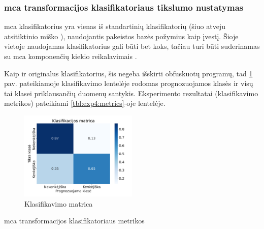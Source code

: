 \subsubsection{\gls{mca} transformacijos klasifikatoriaus tikslumo nustatymas}\label{sec:exp:4}

\gls{mca} klasifikatorius yra vienas iš standartinių klasifikatorių (šiuo atveju atsitiktinio miško ), naudojantis pakeistos bazės požymius kaip įvestį. Šioje vietoje naudojamas klasifikatorius gali būti bet koks, tačiau turi būti suderinamas su \gls{mca} komponenčių kiekio reikalavimais . 

Kaip ir originalus klasifikatorius, šis negeba išskirti obfuskuotų programų, tad \ref{fig:exp4:confusion} pav. pateikiamoje klasifikavimo lentelėje rodomas prognozuojamos klasės ir visų tai klasei priklausančių duomenų santykis.
Eksperimento rezultatai (klasifikavimo metrikos) pateikiami \ref{tbl:exp4:metrics}-oje lentelėje.
\begin{figure}[h]
    \centering
    \includegraphics[width=0.5\textwidth]{images/mca_2x2.png}
    \caption{Klasifikavimo matrica}
    \label{fig:exp4:confusion}
\end{figure}

\begin{table}[h]
    \caption{\gls{mca} transformacijos klasifikatoriaus metrikos}
    \centering
    \label{tbl:exp4:metrics}
\end{table}
